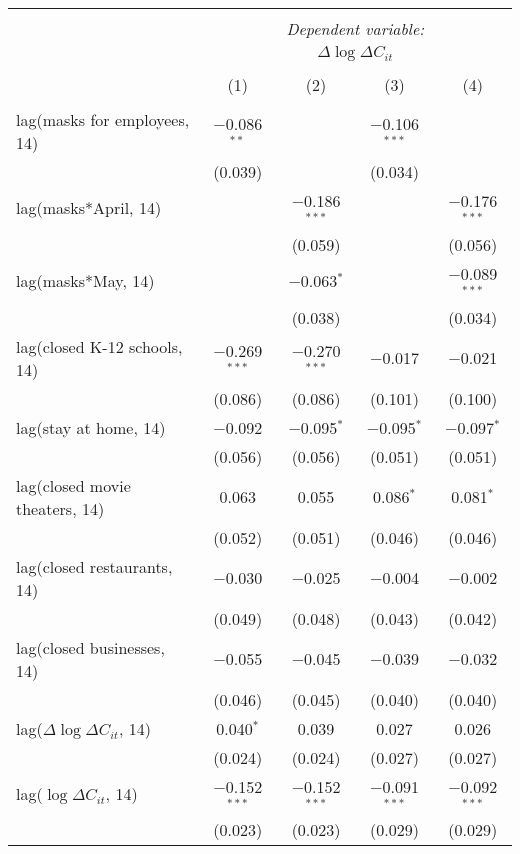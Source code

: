 \begin{tabular}{@{\extracolsep{1pt}}lcccc} 
\\[-1.8ex]\hline 
\hline \\[-1.8ex] 
 & \multicolumn{4}{c}{\textit{Dependent variable:}} \\ 
\cline{2-5} 
 & \multicolumn{4}{c}{$\Delta \log \Delta C_{it}$} \\ 
\\[-1.8ex] & (1) & (2) & (3) & (4)\\ 
\hline \\[-1.8ex] 
 lag(masks for employees, 14) & $-$0.086$^{**}$ &  & $-$0.106$^{***}$ &  \\ 
  & (0.039) &  & (0.034) &  \\ 
  lag(masks*April, 14) &  & $-$0.186$^{***}$ &  & $-$0.176$^{***}$ \\ 
  &  & (0.059) &  & (0.056) \\ 
  lag(masks*May, 14) &  & $-$0.063$^{*}$ &  & $-$0.089$^{***}$ \\ 
  &  & (0.038) &  & (0.034) \\ 
  lag(closed K-12 schools, 14) & $-$0.269$^{***}$ & $-$0.270$^{***}$ & $-$0.017 & $-$0.021 \\ 
  & (0.086) & (0.086) & (0.101) & (0.100) \\ 
  lag(stay at home, 14) & $-$0.092 & $-$0.095$^{*}$ & $-$0.095$^{*}$ & $-$0.097$^{*}$ \\ 
  & (0.056) & (0.056) & (0.051) & (0.051) \\ 
  lag(closed movie theaters, 14) & 0.063 & 0.055 & 0.086$^{*}$ & 0.081$^{*}$ \\ 
  & (0.052) & (0.051) & (0.046) & (0.046) \\ 
  lag(closed restaurants, 14) & $-$0.030 & $-$0.025 & $-$0.004 & $-$0.002 \\ 
  & (0.049) & (0.048) & (0.043) & (0.042) \\ 
  lag(closed businesses, 14) & $-$0.055 & $-$0.045 & $-$0.039 & $-$0.032 \\ 
  & (0.046) & (0.045) & (0.040) & (0.040) \\ 
  lag($\Delta \log \Delta C_{it}$, 14) & 0.040$^{*}$ & 0.039 & 0.027 & 0.026 \\ 
  & (0.024) & (0.024) & (0.027) & (0.027) \\ 
  lag($\log \Delta C_{it}$, 14) & $-$0.152$^{***}$ & $-$0.152$^{***}$ & $-$0.091$^{***}$ & $-$0.092$^{***}$ \\ 
  & (0.023) & (0.023) & (0.029) & (0.029) \\ 

\end{tabular}
